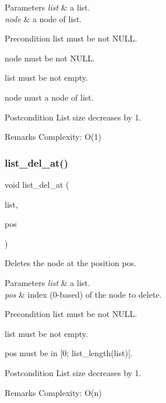 \begin{DoxyParams}{Parameters}
{\em list} & a list. \\
\hline
{\em node} & a node of {\ttfamily list}.\\
\hline
\end{DoxyParams}
\begin{DoxyPrecond}{Precondition}
{\ttfamily list} must be not N\+U\+LL. 

{\ttfamily node} must be not N\+U\+LL. 

{\ttfamily list} must be not empty. 

{\ttfamily node} must a node of {\ttfamily list}.
\end{DoxyPrecond}
\begin{DoxyPostcond}{Postcondition}
List size decreases by 1.
\end{DoxyPostcond}
\begin{DoxyRemark}{Remarks}
Complexity\+: O(1) 
\end{DoxyRemark}
\mbox{\label{list_8h_a1b32056f04fe6cce76bc8774b462598f}} 
\subsubsection{list\+\_\+del\+\_\+at()}
{\footnotesize\ttfamily void list\+\_\+del\+\_\+at (\begin{DoxyParamCaption}\item[{struct \textbf{ list} $\ast$}]{list,  }\item[{size\+\_\+t}]{pos }\end{DoxyParamCaption})\hspace{0.3cm}{\ttfamily [inline]}}

Deletes the node at the position {\ttfamily pos}.


\begin{DoxyParams}{Parameters}
{\em list} & a list. \\
\hline
{\em pos} & index (0-\/based) of the node to delete.\\
\hline
\end{DoxyParams}
\begin{DoxyPrecond}{Precondition}
{\ttfamily list} must be not N\+U\+LL. 

{\ttfamily list} must be not empty. 

{\ttfamily pos} must be in [0; list\+\_\+length(list)[.
\end{DoxyPrecond}
\begin{DoxyPostcond}{Postcondition}
List size decreases by 1.
\end{DoxyPostcond}
\begin{DoxyRemark}{Remarks}
Complexity\+: O(n) 
\end{DoxyRemark}
\mbox{\label{list_8h_ab31246f096207d08b4756bd2c209fa2b}} 
